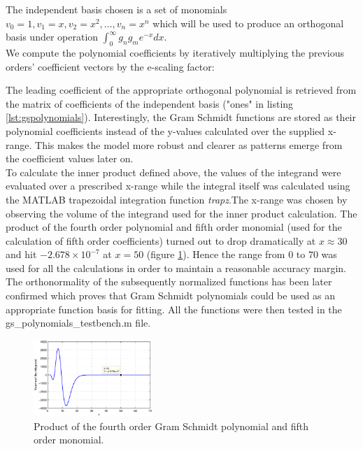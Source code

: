 \documentclass[a4paper]{article}
\numberwithin{equation}{section}
\begin{document}
The independent basis chosen is a set of monomials $v_0 = 1, v_1 = x, v_2 = x^2, \ldots, v_n=x^n$ which will be used to produce an orthogonal basis under operation $\int_{0}^{\infty} g_n g_m e^{-x} dx$.\\
We compute the polynomial coefficients by iteratively multiplying the previous orders' coefficient vectors by the e-scaling factor:



\noindent The leading coefficient of the appropriate orthogonal polynomial is retrieved from the matrix of coefficients of the independent basis ("ones" in listing \ref{lst:gspolynomials}). Interestingly, the Gram Schmidt functions are stored as their polynomial coefficients instead of the y-values calculated over the supplied x-range. This makes the model more robust and clearer as patterns emerge from the coefficient values later on. \\

\noindent To calculate the inner product defined above, the values of the integrand were evaluated over a prescribed x-range while the integral itself was calculated using the MATLAB trapezoidal integration function \textit{trapz}.The x-range was chosen by observing the volume of the integrand used for the inner product calculation. The product of the fourth order polynomial and fifth order monomial (used for the calculation of fifth order coefficients) turned out to drop dramatically at $x \approx 30$ and hit $-2.678 \times 10^{-7}$ at $x=50$ (figure \ref{fig:integrand}). Hence the range from $0$ to $70$ was used for all the calculations in order to maintain a reasonable accuracy margin. The orthonormality of the subsequently normalized functions has been later confirmed which proves that Gram Schmidt polynomials could be used as an appropriate function basis for fitting. All the functions were then tested in the gs\_polynomials\_testbench.m file.

\begin{figure}
\centering
\includegraphics[width=0.40\textwidth]{integrand.eps}
\caption{\label{fig:integrand}Product of the fourth order Gram Schmidt polynomial and fifth order monomial.}
\end{figure}
\end{document}
